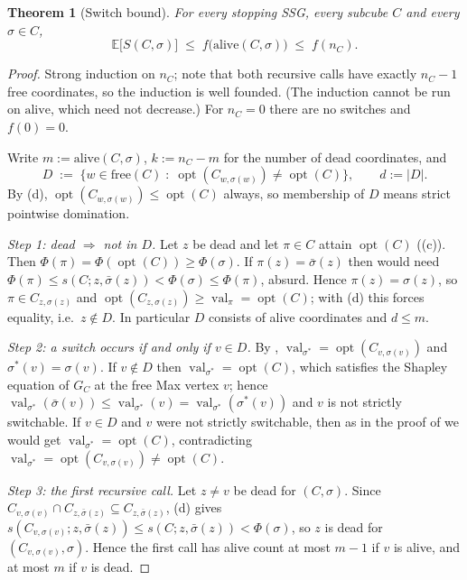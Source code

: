 \documentclass[11pt]{article}
\theoremstyle{plain}
\newtheorem{theorem}{Theorem}[section]
\theoremstyle{definition}
\DeclareMathOperator{\val}{val}
\DeclareMathOperator{\opt}{opt}
\begin{document}
\begin{theorem}[Switch bound]\label{thm:rf-bound}
For every stopping SSG, every subcube $C$ and every $\sigma\in C$,
\[
  \mathbb{E}\bigl[S(C,\sigma)\bigr]\;\le\;f\bigl(\mathrm{alive}(C,\sigma)\bigr)\;\le\;f(n_C).
\]
\end{theorem}

\begin{proof}
Strong induction on $n_C$; note that both recursive calls have exactly
$n_C-1$ free coordinates, so the induction is well founded. (The
induction cannot be run on $\mathrm{alive}$, which need not decrease.)
For $n_C=0$ there are no switches and $f(0)=0$.

Write $m:=\mathrm{alive}(C,\sigma)$, $k:=n_C-m$ for the number of dead
coordinates, and
\[
  D\;:=\;\bigl\{w\in\mathrm{free}(C)\;:\;\opt(C_{w,\sigma(w)})\ne\opt(C)\bigr\},
  \qquad d:=|D| .
\]
By (d), $\opt(C_{w,\sigma(w)})\le\opt(C)$ always, so
membership of $D$ means strict pointwise domination.

\smallskip\noindent\emph{Step 1: dead $\Rightarrow$ not in $D$.}
Let $z$ be dead and let $\pi\in C$ attain $\opt(C)$
((c)). Then $\Phi(\pi)=\Phi(\opt(C))\ge\Phi(\sigma)$.
If $\pi(z)=\bar\sigma(z)$ then  would need
$\Phi(\pi)\le s(C;z,\bar\sigma(z))<\Phi(\sigma)\le\Phi(\pi)$, absurd.
Hence $\pi(z)=\sigma(z)$, so $\pi\in C_{z,\sigma(z)}$ and
$\opt(C_{z,\sigma(z)})\ge\val_\pi=\opt(C)$; with
(d) this forces equality, i.e.\ $z\notin D$. In
particular $D$ consists of alive coordinates and $d\le m$.

\smallskip\noindent\emph{Step 2: a switch occurs if and only if $v\in D$.}
By , $\val_{\sigma^{\!*}}=\opt(C_{v,\sigma(v)})$ and
$\sigma^{\!*}(v)=\sigma(v)$. If $v\notin D$ then
$\val_{\sigma^{\!*}}=\opt(C)$, which satisfies the Shapley equation of
$G_C$ at the free Max vertex $v$; hence
$\val_{\sigma^{\!*}}(\bar\sigma(v))\le\val_{\sigma^{\!*}}(v)=\val_{\sigma^{\!*}}(\sigma^{\!*}(v))$
and $v$ is not strictly switchable. If $v\in D$ and $v$ were not strictly
switchable, then as in the proof of  we would get
$\val_{\sigma^{\!*}}=\opt(C)$, contradicting
$\val_{\sigma^{\!*}}=\opt(C_{v,\sigma(v)})\ne\opt(C)$.

\smallskip\noindent\emph{Step 3: the first recursive call.}
Let $z\ne v$ be dead for $(C,\sigma)$. Since
$C_{v,\sigma(v)}\cap C_{z,\bar\sigma(z)}\subseteq C_{z,\bar\sigma(z)}$,
(d) gives
$s(C_{v,\sigma(v)};z,\bar\sigma(z))\le s(C;z,\bar\sigma(z))<\Phi(\sigma)$,
so $z$ is dead for $(C_{v,\sigma(v)},\sigma)$. Hence the first call has
alive count at most $m-1$ if $v$ is alive, and at most $m$ if $v$ is
dead.


\end{proof}
\end{document}
